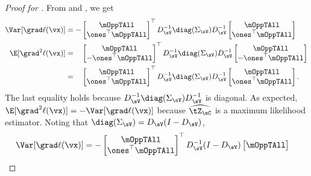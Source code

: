 \begin{proof}[Proof for ]
From  and , we get
  \begin{align*}
    \Var [\grad \ell(\vx)] &= -
        \begin{bmatrix}
          \mOppTAll \\
          \ones^\top \mOppTAll
        \end{bmatrix}^\top
          D_{\sV}^{-1} \diag(\Sigma_\sV) D_{\sV}^{-1} 
        \begin{bmatrix}
          \mOppTAll \\
          \ones^\top \mOppTAll
        \end{bmatrix} \\
        \E[\grad^2 \ell(\vx)] 
        &= \hphantom{-}
        \begin{bmatrix}
          \mOppTAll \\
          - \ones^\top \mOppTAll
        \end{bmatrix}^\top
          D_{\sV}^{-1} \diag(\Sigma_\sV) D_{\sV}^{-1} 
        \begin{bmatrix}
          \mOppTAll \\
          - \ones^\top \mOppTAll
        \end{bmatrix} \\
        &= \hphantom{-}
        \begin{bmatrix}
          \mOppTAll \\
          \ones^\top \mOppTAll
        \end{bmatrix}^\top
          D_{\sV}^{-1} \diag(\Sigma_\sV) D_{\sV}^{-1} 
        \begin{bmatrix}
          \mOppTAll \\
          \ones^\top \mOppTAll
        \end{bmatrix}.
  \end{align*}
The last equality holds because $D_{\sV}^{-1} \diag(\Sigma_\sV)
D_{\sV}^{-1}$ is diagonal.
As expected, $\E[\grad^2 \ell(\vx)] = -\Var [\grad \ell(\vx)]$ because
$\widehat{\tZ_\sC}$ is a maximum likelihood estimator. 
Noting that $\diag(\Sigma_\sV) = D_\sV (I - D_\sV)$, 
\begin{align*}
  \Var [\grad \ell(\vx)] &=
      - \begin{bmatrix}
        \mOppTAll \\
        \ones^\top \mOppTAll
      \end{bmatrix}^\top
        D_{\sV}^{-1} (I - D_\sV) 
      \begin{bmatrix}
        \mOppTAll \\

\end{bmatrix}
\end{align*}
\end{proof}
